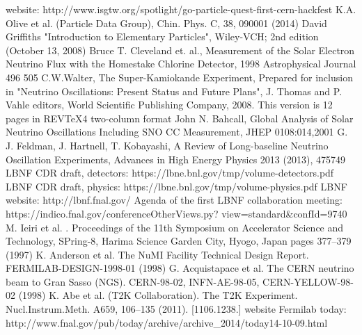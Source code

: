 \begin{thebibliography}{1}
    website: http://www.isgtw.org/spotlight/go-particle-quest-first-cern-hackfest
    K.A. Olive et al. (Particle Data Group), Chin. Phys. C, 38, 090001 (2014) 
    David Griffiths "Introduction to Elementary Particles", Wiley-VCH; 2nd edition (October 13, 2008)
    Bruce T. Cleveland et. al., Measurement of the Solar Electron Neutrino Flux with the Homestake Chlorine Detector, 1998 Astrophysical Journal 496 505
    C.W.Walter, The Super-Kamiokande Experiment, Prepared for inclusion in "Neutrino Oscillations: Present Status and Future Plans", J. Thomas and P. Vahle editors, World Scientific Publishing Company, 2008. This version is 12 pages in REVTeX4 two-column format
    John N. Bahcall, Global Analysis of Solar Neutrino Oscillations Including SNO CC Measurement, JHEP 0108:014,2001
    G. J. Feldman, J. Hartnell, T. Kobayashi, A Review of Long-baseline Neutrino Oscillation Experiments, Advances in High Energy Physics 2013 (2013), 475749
    LBNF CDR draft, detectors: https://lbne.bnl.gov/tmp/volume-detectors.pdf
    LBNF CDR draft, physics: https://lbne.bnl.gov/tmp/volume-physics.pdf
    LBNF website: http://lbnf.fnal.gov/
    Agenda of the first LBNF collaboration meeting: https://indico.fnal.gov/conferenceOtherViews.py? view=standard\&confId=9740
    M. Ieiri et al. . Proceedings of the 11th Symposium on Accelerator Science and Technology, SPring-8,
Harima Science Garden City, Hyogo, Japan pages 377–379 (1997)
    K. Anderson et al. The NuMI Facility Technical Design Report. FERMILAB-DESIGN-1998-01 (1998)
    G. Acquistapace et al. The CERN neutrino beam to Gran Sasso (NGS). CERN-98-02, INFN-AE-98-05,
CERN-YELLOW-98-02 (1998)
    K. Abe et al. (T2K Collaboration). The T2K Experiment. Nucl.Instrum.Meth. A659, 106–135 (2011).
[1106.1238.]
    website Fermilab today: http://www.fnal.gov/pub/today/archive/archive\_2014/today14-10-09.html
\end{thebibliography}
